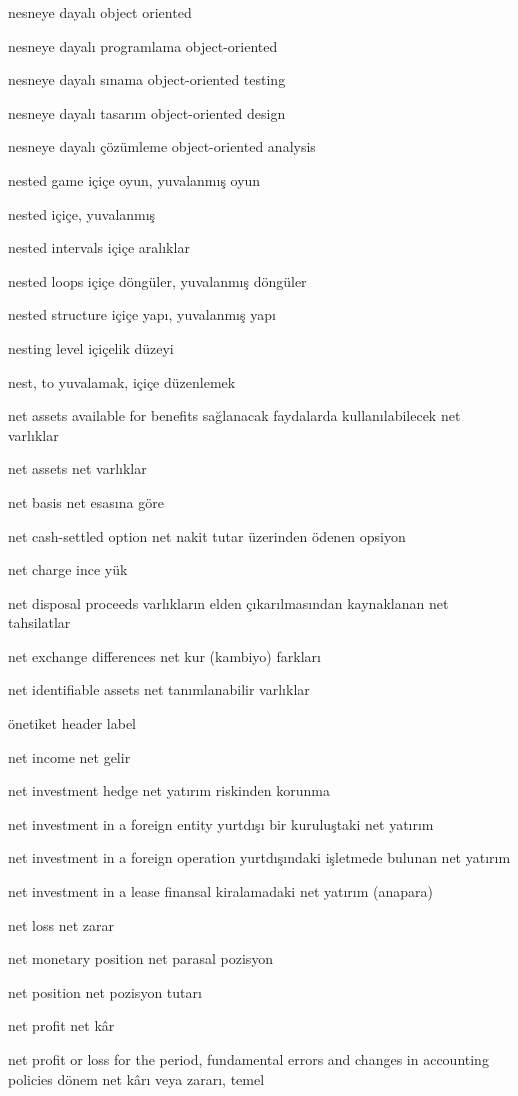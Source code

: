 \documentclass[12pt,fleqn]{article}\usepackage{../../common}
\begin{document}
nesneye dayalı object oriented

nesneye dayalı programlama object-oriented

nesneye dayalı sınama object-oriented testing

nesneye dayalı tasarım object-oriented design

nesneye dayalı çözümleme object-oriented analysis

nested game içiçe oyun, yuvalanmış oyun

nested içiçe, yuvalanmış

nested intervals içiçe aralıklar

nested loops içiçe döngüler, yuvalanmış döngüler

nested structure içiçe yapı, yuvalanmış yapı

nesting level içiçelik düzeyi

nest, to yuvalamak, içiçe düzenlemek

net assets available for benefits sağlanacak faydalarda kullanılabilecek net varlıklar

net assets net varlıklar

net basis net esasına göre

net cash-settled option net nakit tutar üzerinden ödenen opsiyon

net charge ince yük

net disposal proceeds varlıkların elden çıkarılmasından kaynaklanan net tahsilatlar

net exchange differences net kur (kambiyo) farkları

net identifiable assets net tanımlanabilir varlıklar

önetiket header label

net income net gelir

net investment hedge net yatırım riskinden korunma

net investment in a foreign entity yurtdışı bir kuruluştaki net yatırım

net investment in a foreign operation yurtdışındaki işletmede bulunan net yatırım

net investment in a lease finansal kiralamadaki net yatırım (anapara)

net loss net zarar

net monetary position net parasal pozisyon

net position net pozisyon tutarı

net profit net kâr

net profit or loss for the period, fundamental errors and changes in accounting policies dönem net kârı veya zararı, temel
\end{document}
